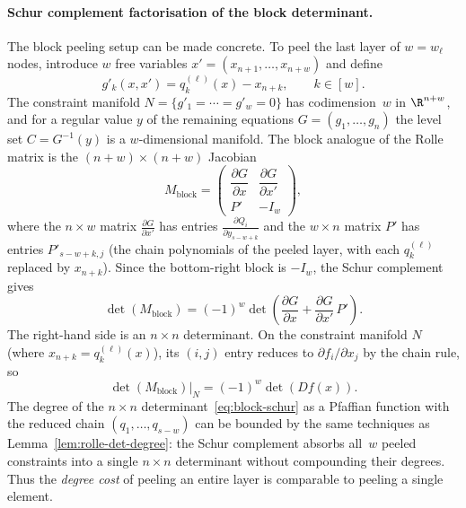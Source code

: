 \paragraph{Schur complement factorisation of the block determinant.}
The block peeling setup can be made concrete. To peel the last layer of $w = w_\ell$ nodes, introduce $w$ free variables $x' = (x_{n+1}, \ldots, x_{n+w})$ and define
\begin{equation*}
  g'_k(x, x') = q_k^{(\ell)}(x) - x_{n+k}, \qquad k \in [w].
\end{equation*}
The constraint manifold $N = \{g'_1 = \cdots = g'_w = 0\}$ has codimension~$w$ in $\R^{n+w}$, and for a regular value $y$ of the remaining equations $G = (g_1, \ldots, g_n)$ the level set $C = G^{-1}(y)$ is a $w$-dimensional manifold. The block analogue of the Rolle matrix is the $(n+w) \times (n+w)$ Jacobian
\begin{equation}\label{eq:block-rolle-matrix}
  M_{\mathrm{block}} = \begin{pmatrix} \dfrac{\partial G}{\partial x} & \dfrac{\partial G}{\partial x'} \\[6pt] P' & -I_w \end{pmatrix},
\end{equation}
where the $n \times w$ matrix $\frac{\partial G}{\partial x'}$ has entries $\frac{\partial Q_i}{\partial y_{s-w+k}}$ and the $w \times n$ matrix $P'$ has entries $P'_{s-w+k,j}$ (the chain polynomials of the peeled layer, with each $q_k^{(\ell)}$ replaced by $x_{n+k}$). Since the bottom-right block is $-I_w$, the Schur complement gives
\begin{equation}\label{eq:block-schur}
  \det(M_{\mathrm{block}}) = (-1)^w \det\!\left(\frac{\partial G}{\partial x} + \frac{\partial G}{\partial x'}\, P'\right).
\end{equation}
The right-hand side is an $n \times n$ determinant. On the constraint manifold $N$ (where $x_{n+k} = q_k^{(\ell)}(x)$), its $(i,j)$ entry reduces to $\partial f_i/\partial x_j$ by the chain rule, so
\begin{equation}\label{eq:block-det-jacobian}
  \det(M_{\mathrm{block}})\big|_N = (-1)^w \det(Df(x)).
\end{equation}
The degree of the $n \times n$ determinant~\eqref{eq:block-schur} as a Pfaffian function with the reduced chain $(q_1, \ldots, q_{s-w})$ can be bounded by the same techniques as Lemma~\ref{lem:rolle-det-degree}: the Schur complement absorbs all~$w$ peeled constraints into a single $n \times n$ determinant without compounding their degrees. Thus the \emph{degree cost} of peeling an entire layer is comparable to peeling a single element.


